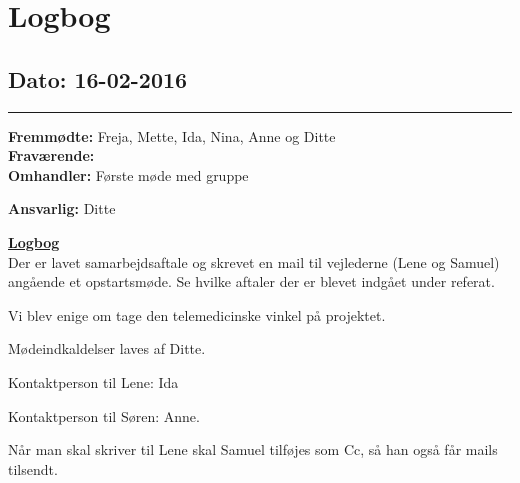 \chapter{Logbog}
\section{Dato: 16-02-2016}
\hrule
\textbf{Fremmødte:} Freja, Mette, Ida, Nina, Anne og Ditte \\
\textbf{Fraværende: } \\
\textbf{Omhandler:} Første møde med gruppe

\textbf{Ansvarlig:} Ditte 

\underline{\textbf{Logbog}}\\
Der er lavet samarbejdsaftale og skrevet en mail til vejlederne (Lene og Samuel) angående et opstartsmøde. Se hvilke aftaler der er blevet indgået under referat. 

Vi blev enige om tage den telemedicinske vinkel på projektet.

Mødeindkaldelser laves af Ditte.

Kontaktperson til Lene: Ida

Kontaktperson til Søren: Anne.

Når man skal skriver til Lene skal Samuel tilføjes som Cc, så han også får mails tilsendt. 






